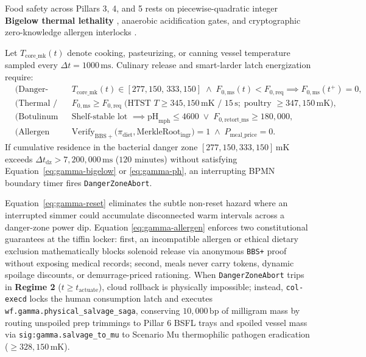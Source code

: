 Food safety across Pillars 3, 4, and 5 rests on piecewise-quadratic integer \textbf{Bigelow
thermal lethality} \parencite{bigelow1921thermal}, anaerobic acidification gates, and
cryptographic zero-knowledge allergen interlocks \parencite{camenisch2004signature}.

\begin{invariant}
\label{inv:gamma-haccp}
Let $T_{\mathrm{core\_mk}}(t)$ denote cooking, pasteurizing, or canning vessel temperature
sampled every $\Delta t = 1000\,\mathrm{ms}$. Culinary release and smart-larder latch
energization require:
{\footnotesize
\begin{align}
    &\text{(Danger-Zone Reset)} && T_{\mathrm{core\_mk}}(t) \in [277{,}150,\, 333{,}150] \;\land\; F_{0,\mathrm{ms}}(t) < F_{0,\mathrm{req}} \implies F_{0,\mathrm{ms}}(t^+) = 0, \label{eq:gamma-reset}\\
    &\text{(Thermal / Retort)} && F_{0,\mathrm{ms}} \ge F_{0,\mathrm{req}} \;\big(\text{HTST } T \ge 345{,}150\,\mathrm{mK}\text{ / }15\,\mathrm{s};\;\text{poultry } \ge 347{,}150\,\mathrm{mK}\big), \label{eq:gamma-bigelow}\\
    &\text{(Botulinum Acid)} && \text{Shelf-stable lot } \implies \mathrm{pH}_{\mathrm{mph}} \le 4600 \;\lor\; F_{0,\mathrm{retort\_ms}} \ge 180{,}000, \label{eq:gamma-ph}\\
    &\text{(Allergen \& Price)} && \mathrm{Verify}_{\mathrm{BBS+}}\!\big(\pi_{\mathrm{diet}}, \mathrm{MerkleRoot}_{\mathrm{ingr}}\big) = 1 \;\land\; P_{\mathrm{meal\_price}} = 0. \label{eq:gamma-allergen}
\end{align}
}
If cumulative residence in the bacterial danger zone $[277{,}150, 333{,}150]\,\mathrm{mK}$
exceeds $\Delta t_{\mathrm{dz}} > 7{,}200{,}000\,\mathrm{ms}$ ($120\text{ minutes}$) without
satisfying Equation~\eqref{eq:gamma-bigelow} or \eqref{eq:gamma-ph}, an interrupting BPMN
boundary timer fires \texttt{DangerZoneAbort}.
\end{invariant}

Equation~\eqref{eq:gamma-reset} eliminates the subtle non-reset hazard where an interrupted
simmer could accumulate disconnected warm intervals across a danger-zone power dip. Equation
\eqref{eq:gamma-allergen} enforces two constitutional guarantees at the tiffin locker: first,
an incompatible allergen or ethical dietary exclusion mathematically blocks solenoid
release via anonymous \texttt{BBS+} proof without exposing medical records; second, meals
never carry tokens, dynamic spoilage discounts, or demurrage-priced rationing. When
\texttt{DangerZoneAbort} trips in \textbf{Regime 2} ($t \ge t_{\mathrm{actuate}}$), cloud
rollback is physically impossible; instead, \texttt{col-execd} locks the human consumption
latch and executes \texttt{wf.gamma.physical\_salvage\_saga}, conserving $10{,}000\,\mathrm{bp}$
of milligram mass by routing unspoiled prep trimmings to Pillar 6 BSFL trays and spoiled
vessel mass via \texttt{sig:gamma.salvage\_to\_mu} to Scenario Mu thermophilic pathogen
eradication ($\ge 328{,}150\,\mathrm{mK}$).

